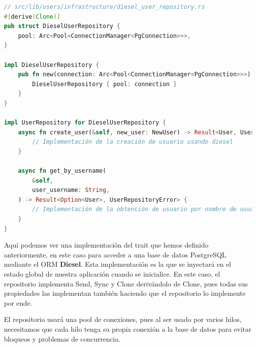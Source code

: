 \begin{lstlisting}[language=Rust, caption={Implementación del repositorio de usuarios}, label={lst:impl-repository}]
// src/lib/users/infrastructure/diesel_user_repository.rs
#[derive(Clone)]
pub struct DieselUserRepository {
    pool: Arc<Pool<ConnectionManager<PgConnection>>>,
}

impl DieselUserRepository {
    pub fn new(connection: Arc<Pool<ConnectionManager<PgConnection>>>) -> Self {
        DieselUserRepository { pool: connection }
    }
}

impl UserRepository for DieselUserRepository {
    async fn create_user(&self, new_user: NewUser) -> Result<User, UserRepositoryError> {
        // Implementación de la creación de usuario usando diesel
    }

    async fn get_by_username(
        &self,
        user_username: String,
    ) -> Result<Option<User>, UserRepositoryError> {
        // Implementación de la obtención de usuario por nombre de usuario usando diesel
    }
}
\end{lstlisting}

Aquí podemos ver una implementación del trait que hemos definido anteriormente, en este caso para acceder a una base de datos PostgreSQL mediante el ORM \textbf{Diesel}. Esta implementación es la que se inyectará en el estado global de nuestra aplicación cuando se inicialice.
En este caso, el repositorio implementa Send, Sync y Clone derivándolo de Clone, pues todas sus propiedades las implementan también haciendo que el repositorio lo implemente por ende.

El repositorio usará una pool de conexiones, pues al ser usado por varios hilos, necesitamos que cada hilo tenga su propia conexión a la base de datos para evitar bloqueos y problemas de concurrencia.

